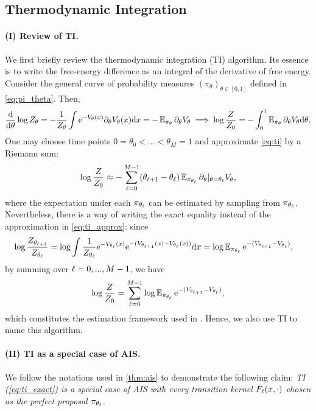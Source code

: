 \subsection{Thermodynamic Integration}
\label{app:rel_work_ti}
\paragraph{(I) Review of TI.} We first briefly review the thermodynamic integration (TI) algorithm. Its essence is to write the free-energy difference as an integral of the derivative of free energy. Consider the general curve of probability measures $(\pi_\theta)_{\theta\in[0,1]}$ defined in \cref{eq:pi_theta}. Then, 
\begin{equation}
    \frac{\mathrm{d}}{\mathrm{d}\theta}\log Z_\theta=-\frac{1}{Z_\theta}\int\mathrm{e}^{-V_\theta(x)}\partial_\theta V_\theta(x)\mathrm{d} x=-\operatorname{\mathbb{E}}_{\pi_\theta}\partial_\theta V_\theta\implies\log\frac{Z}{Z_0}=-\int_0^1\operatorname{\mathbb{E}}_{\pi_\theta}\partial_\theta V_\theta\mathrm{d}\theta.
    \label{eq:ti}    
\end{equation}
One may choose time points $0=\theta_0<...<\theta_M=1$ and approximate \cref{eq:ti} by a Riemann sum:
\begin{equation}
    \log\frac{Z}{Z_0}\approx-\sum_{\ell=0}^{M-1}(\theta_{\ell+1}-\theta_\ell)\operatorname{\mathbb{E}}_{\pi_{\theta_\ell}}\partial_\theta|_{\theta=\theta_\ell}V_{\theta},
    \label{eq:ti_approx}
\end{equation}
where the expectation under each $\pi_{\theta_\ell}$ can be estimated by sampling from $\pi_{\theta_\ell}$. Nevertheless, there is a way of writing the exact equality instead of the approximation in \cref{eq:ti_approx}: since 
\begin{align*}
    \log\frac{Z_{\theta_{\ell+1}}}{Z_{\theta_\ell}}&=\log\int\frac{1}{Z_{\theta_\ell}}\mathrm{e}^{-V_{\theta_\ell}(x)}\mathrm{e}^{-(V_{\theta_{\ell+1}}(x)-V_{\theta_\ell}(x))}\mathrm{d} x=\log\operatorname{\mathbb{E}}_{\pi_{\theta_\ell}}\mathrm{e}^{-(V_{\theta_{\ell+1}}-V_{\theta_\ell})},
\end{align*}
by summing over $\ell=0,...,M-1$, we have
\begin{equation}
    \log\frac{Z}{Z_0}=\sum_{\ell=0}^{M-1}\log\operatorname{\mathbb{E}}_{\pi_{\theta_\ell}}\mathrm{e}^{-(V_{\theta_{\ell+1}}-V_{\theta_\ell})},
    \label{eq:ti_exact}
\end{equation}
which constitutes the estimation framework used in \cite{brosse2018normalizing,ge2020estimating,chehab2023provable,kook2024sampling}. Hence, we also use TI to name this algorithm. 

\paragraph{(II) TI as a special case of AIS.} We follow the notations used in \cref{thm:ais} to demonstrate the following claim: \emph{TI (\cref{eq:ti_exact}) is a special case of AIS with every transition kernel $F_\ell(x,\cdot)$ chosen as the perfect proposal $\pi_{\theta_\ell}$}.

